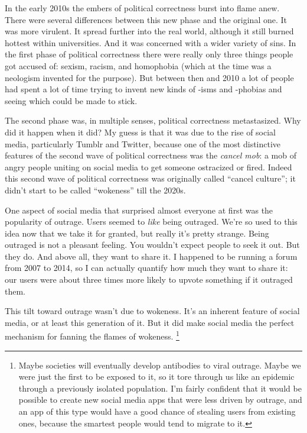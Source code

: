 \documentclass[12pt]{book}
\begin{document}
In the early 2010s the embers of political correctness burst into flame
anew. There were several differences between this new phase and the
original one. It was more virulent. It spread further into the real
world, although it still burned hottest within universities. And it was
concerned with a wider variety of sins. In the first phase of political
correctness there were really only three things people got accused of:
sexism, racism, and homophobia (which at the time was a neologism
invented for the purpose). But between then and 2010 a lot of people had
spent a lot of time trying to invent new kinds of -isms and -phobias and
seeing which could be made to stick.

The second phase was, in multiple senses, political correctness
metastasized. Why did it happen when it did? My guess is that it was due
to the rise of social media, particularly Tumblr and Twitter, because
one of the most distinctive features of the second wave of political
correctness was the \emph{cancel mob}: a mob of angry people uniting on
social media to get someone ostracized or fired. Indeed this second wave
of political correctness was originally called ``cancel culture''; it
didn't start to be called ``wokeness'' till the 2020s.

One aspect of social media that surprised almost everyone at first was
the popularity of outrage. Users seemed to \emph{like} being outraged.
We're so used to this idea now that we take it for granted, but really
it's pretty strange. Being outraged is not a pleasant feeling. You
wouldn't expect people to seek it out. But they do. And above all, they
want to share it. I happened to be running a forum from 2007 to 2014, so
I can actually quantify how much they want to share it: our users were
about three times more likely to upvote something if it outraged them.

This tilt toward outrage wasn't due to wokeness. It's an inherent
feature of social media, or at least this generation of it. But it did
make social media the perfect mechanism for fanning the flames of
wokeness. \footnote{Maybe societies will eventually develop antibodies to viral
outrage. Maybe we were just the first to be exposed to it, so it tore
through us like an epidemic through a previously isolated population.
I'm fairly confident that it would be possible to create new social
media apps that were less driven by outrage, and an app of this type
would have a good chance of stealing users from existing ones, because
the smartest people would tend to migrate to it.}
\end{document}

